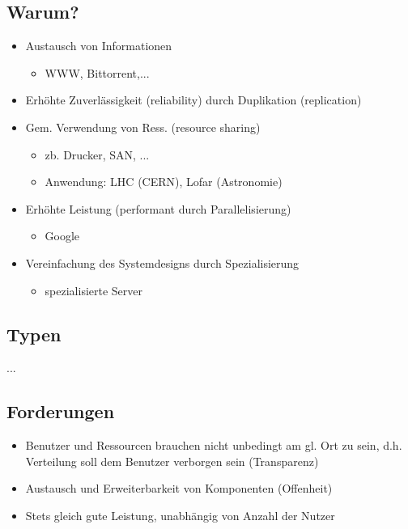\subsection{Warum?}
\begin{itemize}
	\item Austausch von Informationen
		\begin{itemize}
			\item WWW, Bittorrent,...
		\end{itemize}
	\item Erhöhte Zuverlässigkeit (reliability) durch Duplikation (replication)
	\item Gem. Verwendung von Ress. (resource sharing)
		\begin{itemize}
			\item zb. Drucker, SAN, ...
			\item Anwendung: LHC (CERN), Lofar (Astronomie)
		\end{itemize}
	\item Erhöhte Leistung (performant durch Parallelisierung)
		\begin{itemize}
			\item Google
		\end{itemize}
	\item Vereinfachung des Systemdesigns durch Spezialisierung
		\begin{itemize}
			\item spezialisierte Server
		\end{itemize}
\end{itemize}


\subsection{Typen}
... 

\subsection{Forderungen}

\begin{itemize}
	\item Benutzer und Ressourcen brauchen nicht unbedingt am gl. Ort zu sein, d.h. Verteilung soll dem Benutzer verborgen sein (Transparenz)
	\item Austausch und Erweiterbarkeit von Komponenten (Offenheit)
	\item Stets gleich gute Leistung, unabhängig von Anzahl der Nutzer
\end{itemize}


